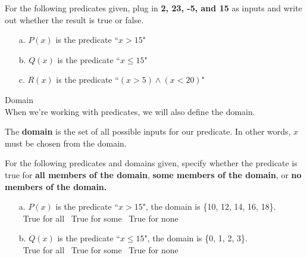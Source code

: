 {    
    \begin{questionNOGRADE}{\thequestion}
        For the following predicates given, plug in \textbf{2, 23, -5, and 15}
        as inputs and write out whether the result is true or false.
        
        \begin{enumerate}
            \item[a.] $P(x)$ is the predicate ``$x > 15$"
            \item[b.] $Q(x)$ is the predicate ``$x \leq 15$"
            \item[c.] $R(x)$ is the predicate ``$(x > 5) \land (x < 20)$"
        \end{enumerate}
    \end{questionNOGRADE}

    \newpage

    \begin{intro}{Domain\\}
        When we're working with predicates, we will also define the domain.

        The \textbf{domain} is the set of all possible inputs for our predicate.
        In other words, $x$ must be chosen from the domain.
    \end{intro}

    \begin{questionNOGRADE}{\thequestion}
        For the following predicates and domains given, specify
        whether the predicate is true for \textbf{all members of the domain},
        \textbf{some members of the domain}, or \textbf{no members of the domain.}
        
        \begin{enumerate}
            \item[a.]   $P(x)$ is the predicate ``$x > 15$", the domain is \{10, 12, 14, 16, 18\}.
                        ~\\
                        \Square \ True for all \tab \Square \ True for some \tab \Square \ True for none \\
            
            \item[b.] $Q(x)$ is the predicate ``$x \leq 15$", the domain is \{0, 1, 2, 3\}.
                        ~\\
                        \Square \ True for all \tab \Square \ True for some \tab \Square \ True for none \\
                        

\end{enumerate}
\end{questionNOGRADE}}
